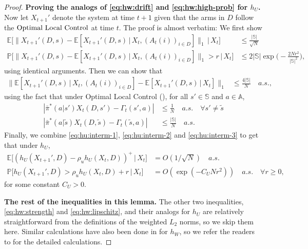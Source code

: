 \documentclass[11pt,letterpaper]{article}
\theoremstyle{plain}
\theoremstyle{definition}
\theoremstyle{remark}
\newcommand{\normbig}[1]{\big\lVert#1\big\rVert}
\newcommand{\normBig}[1]{\Big\lVert#1\Big\rVert}
\newcommand{\E}[1]{\mathbb{E}\left[#1\right]}
\newcommand{\Eplain}[1]{\mathbb{E}[#1]}
\newcommand{\Ebig}[1]{\mathbb{E}\big[#1\big]}
\newcommand{\EBig}[1]{\mathbb{E}\Big[#1\Big]}
\newcommand{\givenplain}{\,|\,}
\newcommand{\givenbig}{\,\big|\,}
\newcommand{\givenBig}{\,\Big|\,}
\newcommand{\Probbig}[1]{\mathbb{P}\big[#1\big]}
\newcommand{\ProbBig}[1]{\mathbb{P}\Big[#1\Big]}
\newcommand{\abs}[1]{\left\lvert#1\right\rvert}
\newcommand{\sspa}{\mathbb{S}}
\newcommand{\aspa}{\mathbb{A}}
\newcommand{\pibar}{{\sysbar{\pi}}}
\newcommand{\pibs}{{\pibar^*}}
\newcommand{\lppriority}{\textup{Optimal Local Control}}
\newcommand{\sysbar}[1]{\bar{#1}}
\newcommand{\wmat}{W}
\newcommand{\umat}{U}
\newcommand{\hw}{h_\wmat}
\newcommand{\hu}{h_\umat}
\newcommand{\rhou}{\rho_{u}}
\newcommand{\sneu}{\tilde{s}}
\begin{document}
\begin{proof}
    \textbf{Proving the analogs of \eqref{eq:hw:drift} and \eqref{eq:hw:high-prob} for $\hu$.}
    Now let $X_{t+1}'$ denote the system at time $t+1$ given that the arms in $D$ follow the $\lppriority$ at time $t$. 
    The proof is almost verbatim: We first show 
    \begin{align}
        \label{eq:hu:interm-1}
         \EBig{\normBig{ X_{t+1}'(D, s) - \Eplain{X_{t+1}'(D, s) \givenplain X_t, (A_t(i))_{i\in D}}}_1 \givenBig X_t} &\leq \frac{|\sspa|}{\sqrt{N}} \\
         \label{eq:hu:interm-2}
         \ProbBig{\normBig{ X_{t+1}'(D, s) - \Eplain{X_{t+1}'(D, s) \givenplain X_t, (A_t(i))_{i\in D}}}_1 > r \givenBig X_t} &\leq 2|\sspa|\exp\Big(-\frac{2N r^2}{|\sspa|^2}\Big),
    \end{align}
    using identical arguments. Then we can show that
    \begin{align}
        \label{eq:hu:interm-3}
        \normbig{\E{X_{t+1}'(D, s) \givenplain X_t, (A_t(i))_{i\in D}} - \E{X_{t+1}'(D, s) \givenplain X_t}}_1 
        &\leq \frac{4|\sspa|}{N} \quad a.s.,
    \end{align}
    using the fact that under Optimal Local Control (), for all $s'\in\sspa$ and $a\in\aspa$, 
    \begin{align*}
        \abs{\pibs(a|s') X_t(D, s')  -  \Gamma_t(s',a)} &\leq \frac{1}{N} \quad a.s. \quad \forall s'\neq \sneu \\
        \abs{\pibs(a|\sneu) X_t(D, \sneu)  -  \Gamma_t(\sneu,a)} &\leq \frac{|\sspa|}{N} \quad a.s. 
    \end{align*}
    Finally, we combine \eqref{eq:hu:interm-1},  \eqref{eq:hu:interm-2} and \eqref{eq:hu:interm-3} to get that under $\hu$, 
    \begin{align}
        \label{eq:hu:drift}
        \Ebig{(\hu(X_{t+1}', D) - \rhou \hu(X_t, D))^+ \givenbig X_t} &= O(1/\sqrt{N}) \quad a.s. \\
        \label{eq:hu:high-prob}
        \Probbig{\hu(X_{t+1}', D) > \rhou \hu(X_t, D) + r   \givenbig X_t} &= O(\exp(-C_U N r^2)) \quad a.s. \quad \forall r \geq 0,
    \end{align}
    for some constant $C_U > 0$. 

    \textbf{The rest of the inequalities in this lemma.}
    The other two inequalities, \eqref{eq:hw:strength} and \eqref{eq:hw:lipschitz}, and their analogs for $\hu$ are relatively straightforward from the definitions of the weighted $L_2$ norms, so we skip them here. Similar calculations have also been done in \cite{HonXieCheWan_24} for $\hw$, so we refer the readers to \cite{HonXieCheWan_24} for the detailed calculations. 
\end{proof}
\end{document}
